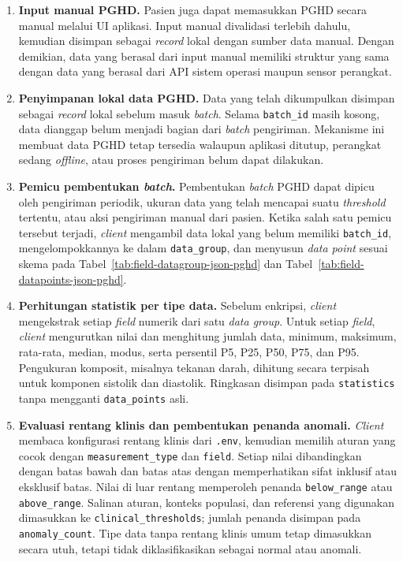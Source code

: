 \begin{enumerate}
    \item \textbf{Input manual PGHD.}
    Pasien juga dapat memasukkan PGHD secara manual melalui UI aplikasi. 
    Input manual divalidasi terlebih dahulu, kemudian disimpan sebagai \textit{record} lokal dengan sumber data manual. 
    Dengan demikian, data yang berasal dari input manual memiliki struktur yang sama dengan data yang berasal dari API sistem operasi maupun sensor perangkat.

    \item \textbf{Penyimpanan lokal data PGHD.}
    Data yang telah dikumpulkan disimpan sebagai \textit{record} lokal sebelum masuk \textit{batch}. 
    Selama \texttt{batch\_id} masih kosong, data dianggap belum menjadi bagian dari \textit{batch} pengiriman. 
    Mekanisme ini membuat data PGHD tetap tersedia walaupun aplikasi ditutup, perangkat sedang \textit{offline}, atau proses pengiriman belum dapat dilakukan.

    \item \textbf{Pemicu pembentukan \textit{batch}.}
    Pembentukan \textit{batch} PGHD dapat dipicu oleh pengiriman periodik, ukuran data yang telah mencapai suatu \textit{threshold} tertentu, atau aksi pengiriman manual dari pasien. 
    Ketika salah satu pemicu tersebut terjadi, \textit{client} mengambil data lokal yang belum memiliki \texttt{batch\_id}, mengelompokkannya ke dalam \texttt{data\_group}, dan menyusun \textit{data point} sesuai skema pada Tabel~\ref{tab:field-datagroup-json-pghd} dan Tabel~\ref{tab:field-datapoints-json-pghd}.

    \item \textbf{Perhitungan statistik per tipe data.}
    Sebelum enkripsi, \textit{client} mengekstrak setiap \textit{field} numerik dari satu \textit{data group}. Untuk setiap \textit{field}, \textit{client} mengurutkan nilai dan menghitung jumlah data, minimum, maksimum, rata-rata, median, modus, serta persentil P5, P25, P50, P75, dan P95. Pengukuran komposit, misalnya tekanan darah, dihitung secara terpisah untuk komponen sistolik dan diastolik. Ringkasan disimpan pada \texttt{statistics} tanpa mengganti \texttt{data\_points} asli.

    \item \textbf{Evaluasi rentang klinis dan pembentukan penanda anomali.}
    \textit{Client} membaca konfigurasi rentang klinis dari \texttt{.env}, kemudian memilih aturan yang cocok dengan \texttt{measurement\_type} dan \texttt{field}. Setiap nilai dibandingkan dengan batas bawah dan batas atas dengan memperhatikan sifat inklusif atau eksklusif batas. Nilai di luar rentang memperoleh penanda \texttt{below\_range} atau \texttt{above\_range}. Salinan aturan, konteks populasi, dan referensi yang digunakan dimasukkan ke \texttt{clinical\_thresholds}; jumlah penanda disimpan pada \texttt{anomaly\_count}. Tipe data tanpa rentang klinis umum tetap dimasukkan secara utuh, tetapi tidak diklasifikasikan sebagai normal atau anomali.


\end{enumerate}
